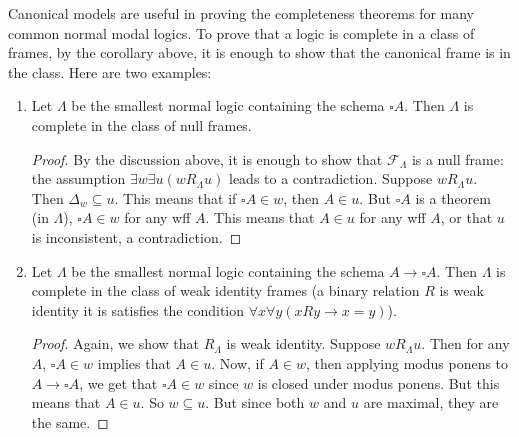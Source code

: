 \documentclass[12pt]{article}
\begin{document}
Canonical models are useful in proving the completeness theorems for many common normal modal logics.  To prove that a logic is complete in a class of frames, by the corollary above, it is enough to show that the canonical frame is in the class.  Here are two examples:
\begin{enumerate}
\item Let $\Lambda$ be the smallest normal logic containing the schema $\square A$.  Then $\Lambda$ is complete in the class of null frames.
\begin{proof}  By the discussion above, it is enough to show that $\mathcal{F}_{\Lambda}$ is a null frame: the assumption $\exists w\exists u (w R_{\Lambda} u)$ leads to a contradiction.  Suppose $w R_{\Lambda} u$.  Then $\Delta_w \subseteq u$.  This means that if $\square A \in w$, then $A\in u$.  But $\square A$ is a theorem (in $\Lambda$), $\square A \in w$ for any wff $A$.  This means that $A\in u$ for any wff $A$, or that $u$ is inconsistent, a contradiction.
\end{proof}
\item Let $\Lambda$ be the smallest normal logic containing the schema $A\to \square A$.  Then $\Lambda$ is complete in the class of weak identity frames (a binary relation $R$ is weak identity it is satisfies the condition $\forall x\forall y (x R y \to x=y)$).
\begin{proof}  Again, we show that $R_{\Lambda}$ is weak identity.  Suppose $w R_{\Lambda} u$.  Then for any $A$, $\square A \in w$ implies that $A\in u$.  Now, if $A\in w$, then applying modus ponens to $A\to \square A$, we get that $\square A \in w$ since $w$ is closed under modus ponens.  But this means that $A\in u$.  So $w\subseteq u$.  But since both $w$ and $u$ are maximal, they are the same.
\end{proof}
\end{enumerate}

\end{document}
